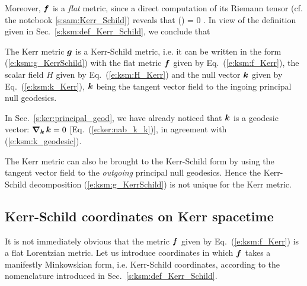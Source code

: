Moreover, $\bm{f}$ is a \emph{flat} metric, since a direct computation of its
Riemann tensor (cf. the notebook \ref{s:sam:Kerr_Schild}) reveals that
\be
    () = 0 .
\ee
In view of the definition given in Sec.~\ref{s:ksm:def_Kerr_Schild},
we conclude that
\begin{greybox}
The Kerr metric $\bm{g}$ is a Kerr-Schild metric, i.e. it can be written in
the form (\ref{e:ksm:g_KerrSchild}) with the flat metric
$\bm{f}$ given by Eq.~(\ref{e:ksm:f_Kerr}), the scalar field $H$ given
by Eq.~(\ref{e:ksm:H_Kerr}) and the null vector $\bm{k}$ given by
Eq.~(\ref{e:ksm:k_Kerr}), $\bm{k}$ being the tangent vector field to
the ingoing principal null geodesics.
\end{greybox}
In Sec.~\ref{s:ker:principal_geod},
we have already noticed that $\bm{k}$ is a geodesic vector:
$\bm{\nabla}_{\bm{k}}\, \bm{k} = 0$ [Eq.~(\ref{e:ker:nab_k_k})], in agreement with
(\ref{e:ksm:k_geodesic}).

\begin{remark}
The Kerr metric can also be brought to the Kerr-Schild form by using the
tangent vector field to the  \emph{outgoing} principal null geodesics. Hence
the Kerr-Schild decomposition (\ref{e:ksm:g_KerrSchild}) is not unique for
the Kerr metric.
\end{remark}

\subsection{Kerr-Schild coordinates on Kerr spacetime}

It is not immediately obvious that the metric $\bm{f}$ given by
Eq.~(\ref{e:ksm:f_Kerr}) is a flat Lorentzian metric.
Let us introduce coordinates in which $\bm{f}$ takes a manifestly Minkowskian
form, i.e. Kerr-Schild coordinates, according to the nomenclature introduced
in Sec.~\ref{s:ksm:def_Kerr_Schild}.

